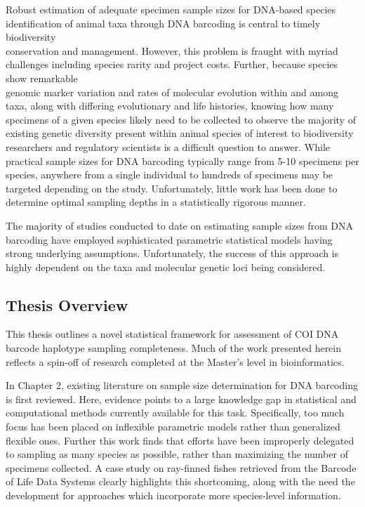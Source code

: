 \vspace{5mm}

Robust estimation of adequate specimen sample sizes for DNA-based species \\ identification of animal taxa through DNA barcoding is central to timely biodiversity \\ conservation and management. However, this problem is fraught with myriad challenges including species rarity and project costs. Further, because species show remarkable \\ genomic marker variation and rates of molecular evolution within and among taxa, along with differing evolutionary and life histories, knowing how many specimens of a given species likely need to be collected to observe the majority of existing genetic diversity present within animal species of interest to biodiversity researchers and regulatory scientists is a difficult question to answer. While practical sample sizes for DNA barcoding typically range from 5-10 specimens per species, anywhere from a single individual to hundreds of specimens may be targeted depending on the study. Unfortunately, little work has been done to determine optimal sampling depths in a statistically rigorous manner. 

The majority of studies conducted to date on estimating sample sizes from DNA barcoding have employed sophisticated parametric statistical models having strong underlying assumptions. Unfortunately, the success of this approach is highly dependent on the taxa and molecular genetic loci being considered. 

\vspace{5mm}

\subsection{Thesis Overview} \label{sec:intro1}

This thesis outlines a novel statistical framework for assessment of COI DNA barcode haplotype sampling completeness. Much of the work presented herein reflects a spin-off of research completed at the Master's level in bioinformatics.  

\vspace{5mm}

In Chapter 2, existing literature on sample size determination for DNA barcoding is first reviewed. Here, evidence points to a large knowledge gap in statistical and computational methods currently available for this task. Specifically, too much focus has been placed on inflexible parametric models rather than generalized flexible ones. Further this work finds that efforts have been improperly delegated to sampling as many species as possible, rather than maximizing the number of specimens collected. A case study on ray-finned fishes retrieved from the Barcode of Life Data Systems \cite{ratnasingham2007bold} clearly highlights this shortcoming, along with the need the development for approaches which incorporate more species-level information. 

